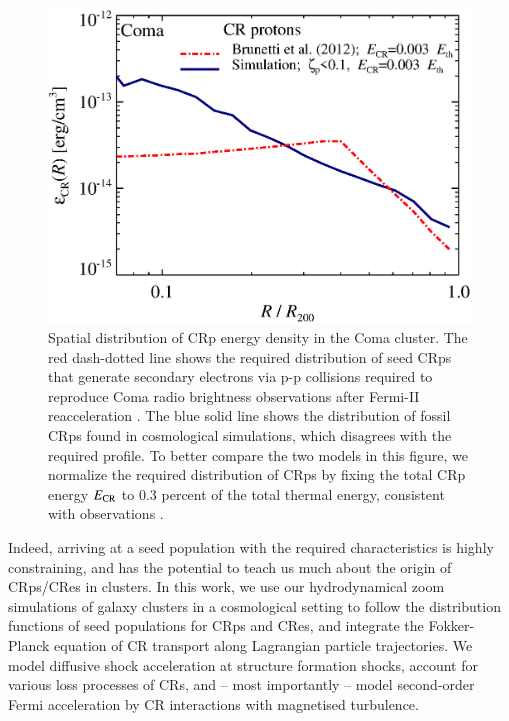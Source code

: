 \documentclass[fleqn,usenatbib,useAMS]{mnras}
\begin{document}
\begin{figure}
  \includegraphics[width=1.0\columnwidth]{fCR.radius.coma.g72a.Rad14.2400p.z0.NL.xKR.eb23.eI067.DII.140.v6.eps}
  \caption{Spatial distribution of CRp energy density in the Coma
    cluster. The red dash-dotted line shows the required distribution
    of seed CRps that generate secondary electrons via p-p collisions
    required to reproduce Coma radio brightness observations after
    Fermi-II reacceleration \citep{brunetti12}. The blue solid line
    shows the distribution of fossil CRps found in cosmological
    simulations, which disagrees with the required profile. To better
    compare the two models in this figure, we normalize the required
    distribution of CRps by fixing the total CRp energy $E_{\mathrm{CR}}$
    to 0.3 percent of the total thermal energy, consistent with
    observations \citep{2014ApJ...787...18A,2012ApJ...757..123A}.}
  \label{fig:Edens}
\end{figure}

Indeed, arriving at a seed population with the required
characteristics is highly constraining, and has the potential to teach
us much about the origin of CRps/CRes in clusters.  In this work, we
use our hydrodynamical zoom simulations of galaxy clusters in a
cosmological setting to follow the distribution functions of seed
populations for CRps and CRes, and integrate the Fokker-Planck
equation of CR transport along Lagrangian particle trajectories. We
model diffusive shock acceleration at structure formation shocks,
account for various loss processes of CRs, and -- most importantly --
model second-order Fermi acceleration by CR interactions with
magnetised turbulence.
\end{document}
